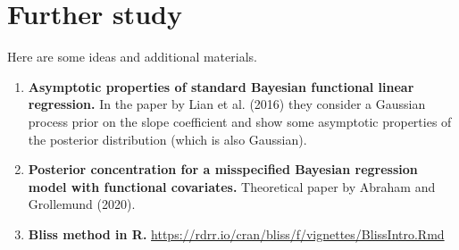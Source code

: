 \documentclass[
  a4paper,
	fontsize=11pt, %
	twoside=false, %
  secnumdepth=2,
	numbers=noenddot, %
]{kaohandt}
\begin{document}
%

\section{Further study}

Here are some ideas and additional materials.

\begin{enumerate}

  \item \textbf{Asymptotic properties of standard Bayesian functional linear regression.} In the paper by Lian et al. (2016) they consider a Gaussian process prior on the slope coefficient and show some asymptotic properties of the posterior distribution (which is also Gaussian).

  \item \textbf{Posterior concentration for a misspecified Bayesian regression model with functional covariates.} Theoretical paper by Abraham and Grollemund (2020).

  \item \textbf{Bliss method in R.} \url{https://rdrr.io/cran/bliss/f/vignettes/BlissIntro.Rmd}

\end{enumerate}
\end{document}
